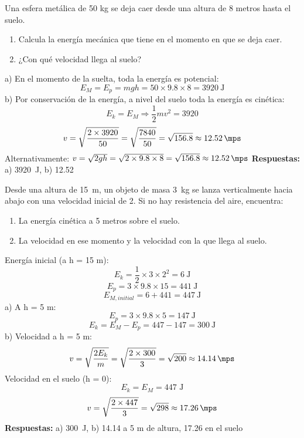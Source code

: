 \begin{exercise}
    Una esfera metálica de 50 kg se deja caer desde una altura de 8 metros hasta el suelo.
    \begin{enumerate}[label=\alph*)]
\item Calcula la energía mecánica que tiene en el momento en que se deja caer.
\item ¿Con qué velocidad llega al suelo?
    \end{enumerate}
    \begin{solu}
        a) En el momento de la suelta, toda la energía es potencial:
        \[
            E_M = E_p = mgh = 50 \times 9.8 \times 8 = \qty{3920}{\joule}
        \]
        b) Por conservación de la energía, a nivel del suelo toda la energía es cinética:
        \[
            E_k = E_M \Rightarrow \frac{1}{2}mv^2 = 3920
        \]
        \[
            v = \sqrt{\frac{2 \times 3920}{50}} = \sqrt{\frac{7840}{50}} = \sqrt{156.8} \approx \qty{12.52}{\mps}
        \]
        Alternativamente: $v = \sqrt{2gh} = \sqrt{2 \times 9.8 \times 8} = \sqrt{156.8} \approx \qty{12.52}{\mps}$
        \textbf{Respuestas:} a) \qty{3920}{\joule}, b) \qty{12.52}{\mps}
    \end{solu}
\end{exercise}

\begin{exercise}
    Desde una altura de \qty{15}{\metre}, un objeto de masa \qty{3}{\kilo\gram} se lanza verticalmente hacia abajo con una velocidad inicial de \qty{2}{\mps}. Si no hay resistencia del aire, encuentra:
    \begin{enumerate}[label=\alph*)]
\item La energía cinética a 5 metros sobre el suelo.
\item La velocidad en ese momento y la velocidad con la que llega al suelo.
    \end{enumerate}
    \begin{solu}
        Energía inicial (a h = 15 m):
        \[
            E_k = \frac{1}{2} \times 3 \times 2^2 = \qty{6}{\joule}
        \]
        \[
            E_p = 3 \times 9.8 \times 15 = \qty{441}{\joule}
        \]
        \[
            E_{M,initial} = 6 + 441 = \qty{447}{\joule}
        \]
        a) A h = 5 m:
        \[
            E_p = 3 \times 9.8 \times 5 = \qty{147}{\joule}
        \]
        \[
            E_k = E_M - E_p = 447 - 147 = \qty{300}{\joule}
        \]
        b) Velocidad a h = 5 m:
        \[
            v = \sqrt{\frac{2E_k}{m}} = \sqrt{\frac{2 \times 300}{3}} = \sqrt{200} \approx \qty{14.14}{\mps}
        \]
        Velocidad en el suelo (h = 0):
        \[
            E_k = E_M = 447 \text{ J}
        \]
        \[
            v = \sqrt{\frac{2 \times 447}{3}} = \sqrt{298} \approx \qty{17.26}{\mps}
        \]
        \textbf{Respuestas:} a) \qty{300}{\joule}, b) \qty{14.14}{\mps} a 5 m de altura, \qty{17.26}{\mps} en el suelo
    \end{solu}
\end{exercise}

